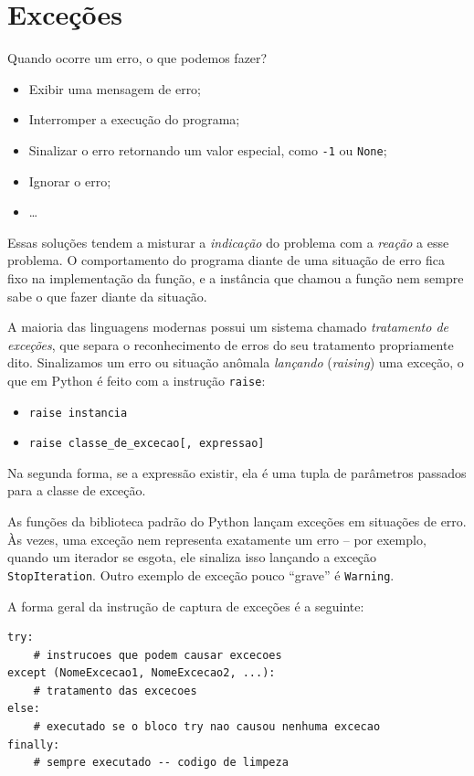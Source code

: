 \documentclass[11pt,a4paper]{article}
\begin{document}
\section{Exceções}

Quando ocorre um erro, o que podemos fazer?

\begin{itemize}
\item Exibir uma mensagem de erro;
\item Interromper a execução do programa;
\item Sinalizar o erro retornando um valor especial, como \texttt{-1} ou \texttt{None};
\item Ignorar o erro;
\item \dots
\end{itemize}

Essas soluções tendem a misturar a \emph{indicação} do problema com a
\emph{reação} a esse problema. O comportamento do programa diante de uma
situação de erro fica fixo na implementação da função, e a instância que
chamou a função nem sempre sabe o que fazer diante da situação.

A maioria das linguagens modernas possui um sistema chamado
\emph{tratamento de exceções}, que separa o reconhecimento de erros do
seu tratamento propriamente dito. Sinalizamos um erro ou situação
anômala \emph{lançando} (\emph{raising}) uma exceção, o que em Python é
feito com a instrução \texttt{raise}:

\begin{itemize}
\item \texttt{raise instancia}
\item \texttt{raise classe\_de\_excecao[, expressao]}
\end{itemize}

Na segunda forma, se a expressão existir, ela é uma tupla de parâmetros
passados para a classe de exceção.

As funções da biblioteca padrão do Python lançam exceções em situações de
erro. Às vezes, uma exceção nem representa exatamente um erro -- por
exemplo, quando um iterador se esgota, ele sinaliza isso lançando a
exceção \texttt{StopIteration}. Outro exemplo de exceção pouco ``grave''
é \texttt{Warning}.

A forma geral da instrução de captura de exceções é a seguinte:

\begin{lstlisting}
try:
    # instrucoes que podem causar excecoes
except (NomeExcecao1, NomeExcecao2, ...):
    # tratamento das excecoes
else:
    # executado se o bloco try nao causou nenhuma excecao
finally:
    # sempre executado -- codigo de limpeza
\end{lstlisting}
\end{document}
